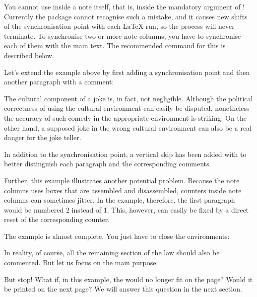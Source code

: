You cannot use  inside a note
itself, that is, inside the mandatory argument of
! Currently the package cannot recognise
such a mistake, and it causes new shifts of the synchronisation point with
each \LaTeX{} run, so the process will never terminate. To synchronise two or
more note columns, you have to synchronise each of them with the main text.
The recommended command for this is described below.%
%
\begin{Example}
  Let's extend the example above by first adding a synchronisation point
  and then another paragraph with a comment:
\begin{lstcode}
    \syncwithnotecolumn[paragraphs]\bigskip
    The cultural component of a joke is, in fact, not
    negligible. Although the political correctness of
    using the cultural environment can easily be
    disputed, nonetheless the accuracy of such comedy
    in the appropriate environment is striking. On
    the other hand, a supposed joke in the wrong
    cultural environment can also be a real danger
    for the joke teller.
\end{lstcode}
  In addition to the synchronisation point, a vertical skip has been added
  with  to better distinguish each paragraph and the
  corresponding comments.

  Further, this example illustrates another potential
  problem. Because the note columns uses boxes that are assembled and
  disassembled, counters inside note columns
  can sometimes jitter. In the example, therefore, the first paragraph would
  be numbered 2 instead of 1. This, however, can easily be fixed by a direct
  reset of the corresponding counter.

  The example is almost complete. You just have to close the environments:
\begin{lstcode}
  \end{addmargin}
  
\end{lstcode}
  In reality, of course, all the remaining section of the law should also be
  commented. But let us focus on the main purpose.
\end{Example}
But stop! What if, in this example, the  would no longer fit
on the page? Would it be printed on the next page? We will answer this
question in the next section.%
\EndIndexGroup


